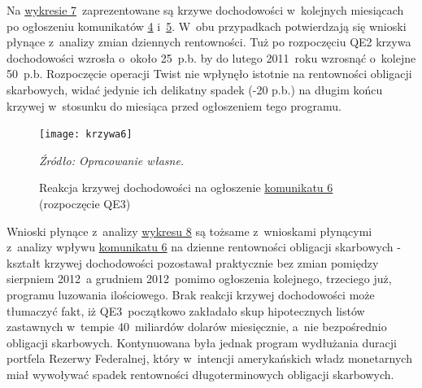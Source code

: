 Na \hyperlink{fig7}{wykresie 7}~zaprezentowane są krzywe dochodowości w~kolejnych miesiącach po ogłoszeniu komunikatów \hyperlink{kom4}{4} i~\hyperlink{kom5}{5}. W~obu przypadkach potwierdzają się wnioski płynące z~analizy zmian dziennych rentowności. Tuż po rozpoczęciu \acs{QE}2 krzywa dochodowości wzrosła o~około 25~p.b. by do lutego 2011~roku wzrosnąć o~kolejne 50~p.b. Rozpoczęcie operacji Twist nie wpłynęło istotnie na rentowności obligacji skarbowych, widać jedynie ich delikatny spadek (-20 p.b.) na długim końcu krzywej w~stosunku do miesiąca przed ogłoszeniem tego programu.

\vspace{0.25cm}
\hypertarget{fig8}{}
\begin{figure}[h]
\begin{centering}
  \texttt{[image: krzywa6]}
    \captionsetup{format=hang}
    \caption{Reakcja krzywej dochodowości na ogłoszenie \protect\hyperlink{kom6}{komunikatu 6} (rozpoczęcie QE3)}
\end{centering}
\begin{flushleft}
\hspace{1cm}\textit{\footnotesize{Źródło: Opracowanie własne.}} \\
\end{flushleft}
\vspace{-0.5cm}
\end{figure}

Wnioski płynące z~analizy \hyperlink{fig8}{wykresu 8} są tożsame z~wnioskami płynącymi z~analizy wpływu \hyperlink{kom6}{komunikatu 6} na dzienne rentowności obligacji skarbowych - kształt krzywej dochodowości pozostawał praktycznie bez zmian pomiędzy sierpniem 2012~a grudniem 2012~pomimo ogłoszenia kolejnego, trzeciego już, programu luzowania ilościowego. Brak reakcji krzywej dochodowości może tłumaczyć fakt, iż \acs{QE}3~początkowo zakładało skup hipotecznych listów zastawnych w~tempie 40~miliardów dolarów miesięcznie, a~nie bezpośrednio obligacji skarbowych. Kontynuowana była jednak program wydłużania duracji portfela Rezerwy Federalnej, który w~intencji amerykańskich władz monetarnych miał wywoływać spadek rentowności długoterminowych obligacji skarbowych.

